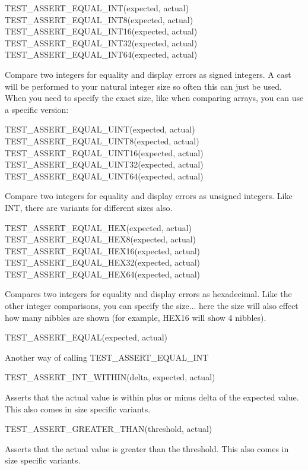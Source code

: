 \begin{DoxyVerb}TEST_ASSERT_EQUAL_INT(expected, actual)
TEST_ASSERT_EQUAL_INT8(expected, actual)
TEST_ASSERT_EQUAL_INT16(expected, actual)
TEST_ASSERT_EQUAL_INT32(expected, actual)
TEST_ASSERT_EQUAL_INT64(expected, actual)
\end{DoxyVerb}


Compare two integers for equality and display errors as signed integers. A cast will be performed to your natural integer size so often this can just be used. When you need to specify the exact size, like when comparing arrays, you can use a specific version\+: \begin{DoxyVerb}TEST_ASSERT_EQUAL_UINT(expected, actual)
TEST_ASSERT_EQUAL_UINT8(expected, actual)
TEST_ASSERT_EQUAL_UINT16(expected, actual)
TEST_ASSERT_EQUAL_UINT32(expected, actual)
TEST_ASSERT_EQUAL_UINT64(expected, actual)
\end{DoxyVerb}


Compare two integers for equality and display errors as unsigned integers. Like I\+NT, there are variants for different sizes also. \begin{DoxyVerb}TEST_ASSERT_EQUAL_HEX(expected, actual)
TEST_ASSERT_EQUAL_HEX8(expected, actual)
TEST_ASSERT_EQUAL_HEX16(expected, actual)
TEST_ASSERT_EQUAL_HEX32(expected, actual)
TEST_ASSERT_EQUAL_HEX64(expected, actual)
\end{DoxyVerb}


Compares two integers for equality and display errors as hexadecimal. Like the other integer comparisons, you can specify the size... here the size will also effect how many nibbles are shown (for example, {\ttfamily H\+E\+X16} will show 4 nibbles). \begin{DoxyVerb}TEST_ASSERT_EQUAL(expected, actual)
\end{DoxyVerb}


Another way of calling T\+E\+S\+T\+\_\+\+A\+S\+S\+E\+R\+T\+\_\+\+E\+Q\+U\+A\+L\+\_\+\+I\+NT \begin{DoxyVerb}TEST_ASSERT_INT_WITHIN(delta, expected, actual)
\end{DoxyVerb}


Asserts that the actual value is within plus or minus delta of the expected value. This also comes in size specific variants.

\begin{DoxyVerb}TEST_ASSERT_GREATER_THAN(threshold, actual)
\end{DoxyVerb}


Asserts that the actual value is greater than the threshold. This also comes in size specific variants.

